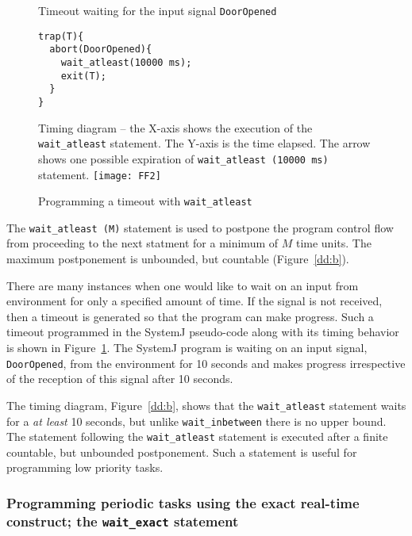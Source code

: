 \begin{figure}[b!]
	\centering
	\vspace{-10pt}
        \begin{SubFloat}{\label{dd:a}Timeout waiting for the input
            signal \texttt{DoorOpened}}
        \begin{lstlisting}[style=sysj,morekeywords={abort,await,emit,present,trap,pause,exit,wait_atleast,suspend}]
trap(T){
  abort(DoorOpened){
    wait_atleast(10000 ms);
    exit(T);  
  }
}
\end{lstlisting}
\end{SubFloat}
\begin{SubFloat}{\label{dd:b}Timing diagram -- the X-axis shows the
    execution of the \texttt{wait\_atleast} statement. The Y-axis is the
    time elapsed. The arrow shows one possible expiration of
    \texttt{wait\_atleast (10000 ms)} statement.}
\texttt{[image: FF2]}
\end{SubFloat}
\caption{Programming a timeout with \texttt{wait\_atleast}}
\label{dd}
\end{figure}

The \texttt{wait\_atleast (M)} statement is used to postpone the program
control flow from proceeding to the next statment for a minimum of $M$
time units. The maximum postponement is unbounded, but countable
(Figure~\ref{dd:b}).

There are many instances when one would like to wait on an input from
environment for only a specified amount of time. If the signal is not
received, then a timeout is generated so that the program can make
progress. Such a timeout programmed in the SystemJ pseudo-code along
with its timing behavior is shown in Figure~\ref{dd}. The SystemJ
program is waiting on an input signal, \texttt{DoorOpened}, from the
environment for 10 seconds and makes progress irrespective of the
reception of this signal after 10 seconds.

The timing diagram, Figure~\ref{dd:b}, shows that the
\texttt{wait\_atleast} statement waits for a \textit{at least} 10
seconds, but unlike \texttt{wait\_inbetween} there is no upper
bound. The statement following the \texttt{wait\_atleast} statement is
executed after a finite countable, but unbounded postponement. Such a
statement is useful for programming low priority tasks.


\subsubsection{Programming periodic tasks using the exact real-time
  construct; the \texttt{wait\_exact} statement}
\label{sec:progr-using-exact}

